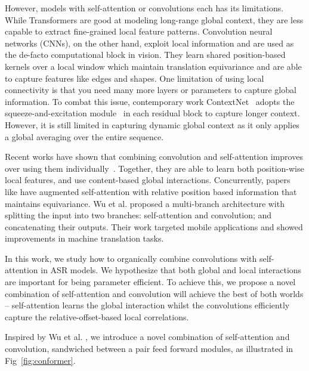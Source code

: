 However, models with self-attention or convolutions each has its limitations. While Transformers are good at modeling long-range global context, they are less capable to extract fine-grained local feature patterns. Convolution neural networks (CNNs), on the other hand, exploit local information and are used as the de-facto computational block in vision. They learn shared position-based kernels over a local window which maintain translation equivariance and are able to capture features like edges and shapes. One limitation of using local connectivity is that you need many more layers or parameters to capture global information. To combat this issue, contemporary work ContextNet~\cite{han2020contextnet} adopts the squeeze-and-excitation module~\cite{hu2018squeeze} in each residual block to capture longer context. However, it is still limited in capturing dynamic global context as it only applies a global averaging over the entire sequence.

Recent works have shown that combining convolution and self-attention improves over using them individually~\cite{bello2019attention}. Together, they are able to learn both position-wise local features, and use content-based global interactions. Concurrently, papers like \cite{yang2019convolutional, yu2018qanet} have augmented self-attention with relative position based information that maintains equivariance. Wu et al. \cite{wu2020lite} proposed a multi-branch architecture with splitting the input into two branches: self-attention and convolution; and concatenating their outputs. Their work targeted mobile applications and showed improvements in machine translation tasks.

\label{sec:model:convolution}

In this work, we study how to organically combine convolutions with self-attention in ASR models. We hypothesize that both global and local interactions are important for being parameter efficient. To achieve this, we propose a novel combination of self-attention and convolution will achieve the best of both worlds -- self-attention learns the global interaction whilst the convolutions efficiently capture the relative-offset-based local correlations.

Inspired by Wu et al. \cite{wu2020lite, lu2019understanding}, we introduce a novel combination of self-attention and convolution, sandwiched between a pair feed forward modules,  as illustrated in Fig~\ref{fig:conformer}.  

